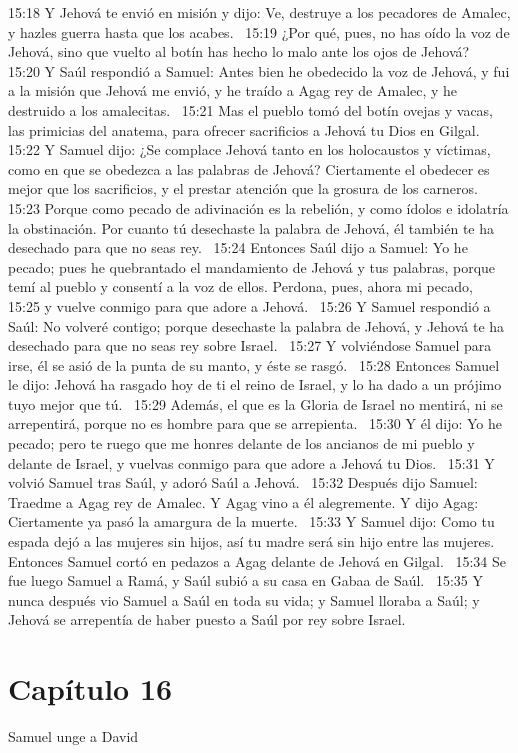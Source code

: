 15:18 Y Jehová te envió en misión y dijo: Ve, destruye a los pecadores de Amalec, y hazles guerra hasta que los acabes.  
15:19 ¿Por qué, pues, no has oído la voz de Jehová, sino que vuelto al botín has hecho lo malo ante los ojos de Jehová?  
15:20 Y Saúl respondió a Samuel: Antes bien he obedecido la voz de Jehová, y fui a la misión que Jehová me envió, y he traído a Agag rey de Amalec, y he destruido a los amalecitas.  
15:21 Mas el pueblo tomó del botín ovejas y vacas, las primicias del anatema, para ofrecer sacrificios a Jehová tu Dios en Gilgal.  
15:22 Y Samuel dijo: ¿Se complace Jehová tanto en los holocaustos y víctimas, como en que se obedezca a las palabras de Jehová? Ciertamente el obedecer es mejor que los sacrificios, y el prestar atención que la grosura de los carneros.  
15:23 Porque como pecado de adivinación es la rebelión, y como ídolos e idolatría la obstinación. Por cuanto tú desechaste la palabra de Jehová, él también te ha desechado para que no seas rey.  
15:24 Entonces Saúl dijo a Samuel: Yo he pecado; pues he quebrantado el mandamiento de Jehová y tus palabras, porque temí al pueblo y consentí a la voz de ellos. Perdona, pues, ahora mi pecado,  
15:25 y vuelve conmigo para que adore a Jehová.  
15:26 Y Samuel respondió a Saúl: No volveré contigo; porque desechaste la palabra de Jehová, y Jehová te ha desechado para que no seas rey sobre Israel.  
15:27 Y volviéndose Samuel para irse, él se asió de la punta de su manto, y éste se rasgó.  
15:28 Entonces Samuel le dijo: Jehová ha rasgado hoy de ti el reino de Israel, y lo ha dado a un prójimo tuyo mejor que tú.  
15:29 Además, el que es la Gloria de Israel no mentirá, ni se arrepentirá, porque no es hombre para que se arrepienta.  
15:30 Y él dijo: Yo he pecado; pero te ruego que me honres delante de los ancianos de mi pueblo y delante de Israel, y vuelvas conmigo para que adore a Jehová tu Dios.  
15:31 Y volvió Samuel tras Saúl, y adoró Saúl a Jehová.  
15:32 Después dijo Samuel: Traedme a Agag rey de Amalec. Y Agag vino a él alegremente. Y dijo Agag: Ciertamente ya pasó la amargura de la muerte.  
15:33 Y Samuel dijo: Como tu espada dejó a las mujeres sin hijos, así tu madre será sin hijo entre las mujeres. Entonces Samuel cortó en pedazos a Agag delante de Jehová en Gilgal.  
15:34 Se fue luego Samuel a Ramá, y Saúl subió a su casa en Gabaa de Saúl.  
15:35 Y nunca después vio Samuel a Saúl en toda su vida; y Samuel lloraba a Saúl; y Jehová se arrepentía de haber puesto a Saúl por rey sobre Israel.  
\section*{Capítulo 16}
Samuel unge a David  

